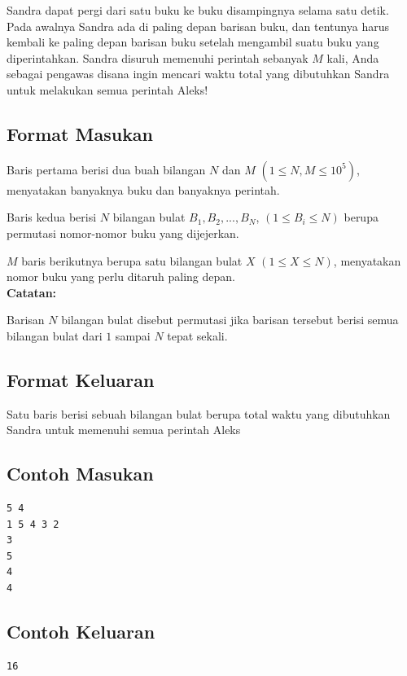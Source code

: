 \documentclass{article}
\begin{document}
Sandra dapat pergi dari satu buku ke buku disampingnya selama satu detik. Pada awalnya Sandra ada di paling depan barisan buku, dan tentunya harus kembali ke paling depan barisan buku setelah mengambil suatu buku yang diperintahkan. Sandra disuruh memenuhi perintah sebanyak $M$ kali, Anda sebagai pengawas disana ingin mencari waktu total yang dibutuhkan Sandra untuk melakukan semua perintah Aleks!

\subsection*{Format Masukan}
Baris pertama berisi dua buah bilangan $N$ dan $M$ $(1 \leq N, M \leq 10^5)$, menyatakan banyaknya buku dan banyaknya perintah.

Baris kedua berisi $N$ bilangan bulat $B_1, B_2, ..., B_N$, $(1 \leq B_i \leq N)$ berupa permutasi nomor-nomor buku yang dijejerkan.

$M$ baris berikutnya berupa satu bilangan bulat $X$ $(1 \leq X \leq N)$, menyatakan nomor buku yang perlu ditaruh paling depan.\\

\textbf{Catatan:}

Barisan $N$ bilangan bulat disebut permutasi jika barisan tersebut berisi semua bilangan bulat dari $1$ sampai $N$ tepat sekali.

\subsection*{Format Keluaran}
Satu baris berisi sebuah bilangan bulat berupa total waktu yang dibutuhkan Sandra untuk memenuhi semua perintah Aleks

\begin{multicols}{2}
\subsection*{Contoh Masukan}
\begin{lstlisting}
5 4
1 5 4 3 2
3
5
4
4

\end{lstlisting}
\columnbreak
\subsection*{Contoh Keluaran}
\begin{lstlisting}
16
\end{lstlisting}
\vfill
\null
\end{multicols}
\end{document}

